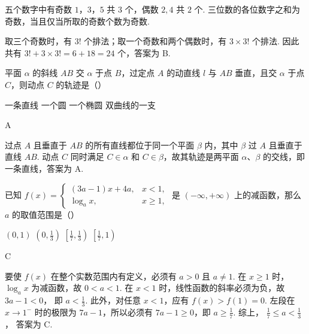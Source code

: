 \begin{solution}
五个数字中有奇数 \(1\)，\(3\)，\(5\) 共 \(3\) 个，偶数 \(2,4\) 共 \(2\) 个. 三位数的各位数字之和为奇数，当且仅当所取的奇数个数为奇数.

取三个奇数时，有 \(3!\) 个排法；取一个奇数和两个偶数时，有 \(3\times3!\) 个排法. 因此共有 \(3!+3\times3!=6+18=24\) 个，答案为 B.
\end{solution}

\begin{problem}
平面 \(\alpha\) 的斜线 \(AB\) 交 \(\alpha\) 于点 \(B\)，过定点 \(A\) 的动直线 \(l\) 与 \(AB\) 垂直，且交 \(\alpha\) 于点 \(C\)，则动点 \(C\) 的轨迹是（\quad）

\choices
    {一条直线}
    {一个圆}
    {一个椭圆}
    {双曲线的一支}
\end{problem}

\begin{answer}
A
\end{answer}

\begin{solution}
过点 \(A\) 且垂直于 \(AB\) 的所有直线都位于同一个平面 \(\beta\) 内，其中 \(\beta\) 过 \(A\) 且垂直于直线 \(AB\). 动点 \(C\) 同时满足 \(C\in\alpha\) 和 \(C\in\beta\)，故其轨迹是两平面 \(\alpha\)、\(\beta\) 的交线，即一条直线，答案为 A.
\end{solution}

\begin{problem}
已知 \(f(x)=\begin{cases}
(3a-1)x+4a, & x<1,\\
\log_{a}x, & x\geqslant1,
\end{cases}\) 是 \((-\infty,+\infty)\) 上的减函数，那么 \(a\) 的取值范围是（\quad）

\choices
    {\((0,1)\)}
    {\(\left(0,\frac{1}{3}\right)\)}
    {\(\left[\frac{1}{7},\frac{1}{3}\right)\)}
    {\(\left[\frac{1}{7},1\right)\)}
\end{problem}

\begin{answer}
C
\end{answer}

\begin{solution}
要使 \(f(x)\) 在整个实数范围内有定义，必须有 \(a>0\) 且 \(a\ne1\). 在 \(x\geqslant1\) 时，\(\log_a x\) 为减函数，故 \(0<a<1\). 在 \(x<1\) 时，线性函数的斜率必须为负，故
\(3a-1<0\)，
即 \(a<\frac13\). 此外，对任意 \(x<1\)，应有 \(f(x)>f(1)=0\). 左段在 \(x\to1^{-}\) 时的极限为 \(7a-1\)，所以必须有 \(7a-1\geqslant0\)，即 \(a\geqslant\frac17\). 综上，
\(\frac17\leqslant a<\frac13\)，
答案为 C.
\end{solution}

